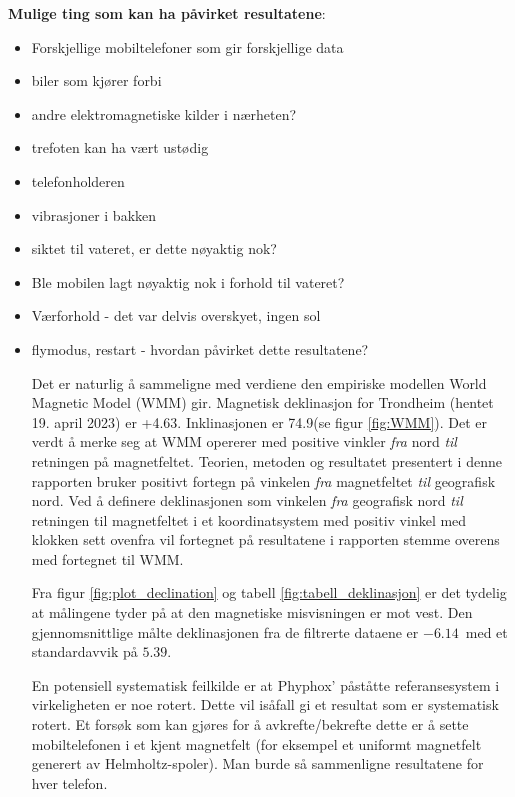 \noindent\textbf{Mulige ting som kan ha påvirket resultatene}:
\begin{itemize}
    \item Forskjellige mobiltelefoner som gir forskjellige data 
    \item biler som kjører forbi
    \item andre elektromagnetiske kilder i nærheten? 
    \item trefoten kan ha vært ustødig
    \item telefonholderen
    \item vibrasjoner i bakken               
    \item siktet til vateret, er dette nøyaktig nok?
    \item Ble mobilen lagt nøyaktig nok i forhold til vateret?
    \item Værforhold - det var delvis overskyet, ingen sol
    \item flymodus, restart - hvordan påvirket dette resultatene?

Det er naturlig å sammeligne med verdiene den empiriske modellen World Magnetic Model (WMM) gir.
Magnetisk deklinasjon for Trondheim (hentet 19. april 2023) er +4.63\textdegree. Inklinasjonen er 74.9\textdegree (se figur \ref{fig:WMM}). 
\newline
Det er verdt å merke seg at WMM opererer med positive vinkler \textit{fra} nord \textit{til} retningen på magnetfeltet. 
Teorien, metoden og resultatet presentert i denne rapporten bruker positivt fortegn på vinkelen \textit{fra} magnetfeltet \textit{til} geografisk nord.
Ved å definere deklinasjonen som vinkelen \textit{fra} geografisk nord \textit{til} retningen til magnetfeltet i et koordinatsystem med positiv vinkel med klokken sett ovenfra vil fortegnet på resultatene i rapporten stemme overens med fortegnet til WMM.  
\par
Fra figur \ref{fig:plot_declination} og tabell \ref{fig:tabell_deklinasjon} er det tydelig at målingene tyder på at den magnetiske misvisningen er mot vest. Den gjennomsnittlige målte deklinasjonen fra de filtrerte dataene er $-6.14$\textdegree\ med et standardavvik på $5.39$\textdegree.
\par
En potensiell systematisk feilkilde er at Phyphox' påståtte referansesystem i virkeligheten er noe rotert. Dette vil isåfall gi et resultat som er systematisk rotert. 
Et forsøk som kan gjøres for å avkrefte/bekrefte dette er å sette mobiltelefonen i et kjent magnetfelt (for eksempel et uniformt magnetfelt generert av Helmholtz-spoler).
Man burde så sammenligne resultatene for hver telefon.


\end{itemize}
